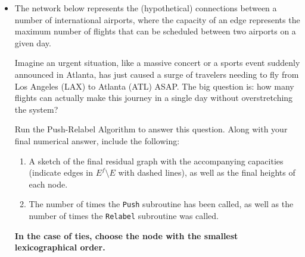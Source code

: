 \documentclass{article}
\begin{document}
\begin{itemize}
    \item[(a)] The network below represents the (hypothetical) connections between a number of international airports, where the capacity of an edge represents the maximum number of flights that can be scheduled between two airports on a given day.

    \vspace{2mm} Imagine an urgent situation, like a massive concert or a sports event suddenly announced in Atlanta, has just caused a surge of travelers needing to fly from Los Angeles (LAX) to Atlanta (ATL) ASAP. The big question is: how many flights can actually make this journey in a single day without overstretching the system?
    
    \vspace{2mm} Run the Push-Relabel Algorithm to answer this question. Along with your final numerical answer, include the following:
    \begin{enumerate}[label=\roman*.]
        \item A sketch of the final residual graph with the accompanying capacities (indicate edges in $E^{f} \setminus E$ with dashed lines), as well as the final heights of each node.
        \item The number of times the \verb+Push+ subroutine has been called, as well as the number of times the \verb+Relabel+ subroutine was called.
    \end{enumerate}
    \textbf{In the case of ties, choose the node with the smallest lexicographical order.}
    \begin{center}
\end{center}
\end{itemize}
\end{document}
